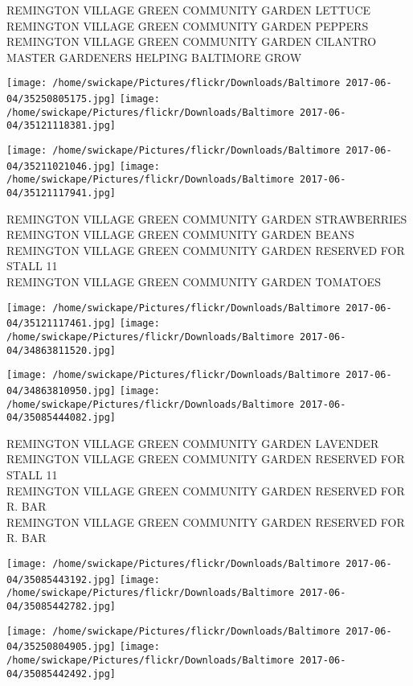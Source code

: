 \documentclass[10pt,letterpaper]{article}
\begin{document}
REMINGTON VILLAGE GREEN COMMUNITY GARDEN LETTUCE\\
REMINGTON VILLAGE GREEN COMMUNITY GARDEN PEPPERS\\
REMINGTON VILLAGE GREEN COMMUNITY GARDEN CILANTRO\\
MASTER GARDENERS HELPING BALTIMORE GROW
\pagebreak

\texttt{[image: /home/swickape/Pictures/flickr/Downloads/Baltimore 2017-06-04/35250805175.jpg]}
\texttt{[image: /home/swickape/Pictures/flickr/Downloads/Baltimore 2017-06-04/35121118381.jpg]}

\texttt{[image: /home/swickape/Pictures/flickr/Downloads/Baltimore 2017-06-04/35211021046.jpg]}
\texttt{[image: /home/swickape/Pictures/flickr/Downloads/Baltimore 2017-06-04/35121117941.jpg]}

REMINGTON VILLAGE GREEN COMMUNITY GARDEN STRAWBERRIES\\
REMINGTON VILLAGE GREEN COMMUNITY GARDEN BEANS\\
REMINGTON VILLAGE GREEN COMMUNITY GARDEN RESERVED FOR STALL 11\\
REMINGTON VILLAGE GREEN COMMUNITY GARDEN TOMATOES
\pagebreak

\texttt{[image: /home/swickape/Pictures/flickr/Downloads/Baltimore 2017-06-04/35121117461.jpg]}
\texttt{[image: /home/swickape/Pictures/flickr/Downloads/Baltimore 2017-06-04/34863811520.jpg]}

\texttt{[image: /home/swickape/Pictures/flickr/Downloads/Baltimore 2017-06-04/34863810950.jpg]}
\texttt{[image: /home/swickape/Pictures/flickr/Downloads/Baltimore 2017-06-04/35085444082.jpg]}

REMINGTON VILLAGE GREEN COMMUNITY GARDEN LAVENDER\\
REMINGTON VILLAGE GREEN COMMUNITY GARDEN RESERVED FOR STALL 11\\
REMINGTON VILLAGE GREEN COMMUNITY GARDEN RESERVED FOR R. BAR\\
REMINGTON VILLAGE GREEN COMMUNITY GARDEN RESERVED FOR R. BAR
\pagebreak

\texttt{[image: /home/swickape/Pictures/flickr/Downloads/Baltimore 2017-06-04/35085443192.jpg]}
\texttt{[image: /home/swickape/Pictures/flickr/Downloads/Baltimore 2017-06-04/35085442782.jpg]}

\texttt{[image: /home/swickape/Pictures/flickr/Downloads/Baltimore 2017-06-04/35250804905.jpg]}
\texttt{[image: /home/swickape/Pictures/flickr/Downloads/Baltimore 2017-06-04/35085442492.jpg]}
\end{document}
